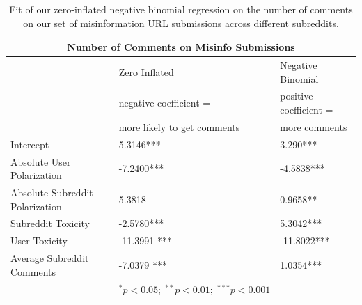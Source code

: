 \begin{table}[b]
\centering
\begin{tabular}{lll}
\toprule
   \multicolumn{3}{c}{\large Number of Comments on Misinfo Submissions}          \\
   \toprule
                                  & {Zero Inflated}  & {Negative Binomial }  \\
                      &       \footnotesize{negative coefficient = } &  \footnotesize{positive coefficient = }\\
                      &       \footnotesize{more likely to get comments} &  \footnotesize{more comments}\\
      \midrule
      Intercept              & 5.3146*** & 3.290***  \\               
      \midrule
      Absolute User Polarization               & -7.2400***  & -4.5838***  \\
      \midrule
      Absolute Subreddit Polarization              & 5.3818 &0.9658** \\
    \midrule
       Subreddit Toxicity & -2.5780***   & 5.3042*** \\
      \midrule
       User Toxicity &   -11.3991  *** &  -11.8022***\\
      \midrule
      Average Subreddit Comments &  -7.0379 *** & 1.0354***  \\
\bottomrule
& $^\ast p<0.05; \;  ^{**} p<0.01; \; ^{***}p<0.001$ \\
\end{tabular}
\caption{Fit of our zero-inflated negative binomial regression on the number of comments on our set of misinformation URL submissions across different subreddits.} 
\label{tbl:misinfo-fit}
\end{table}
